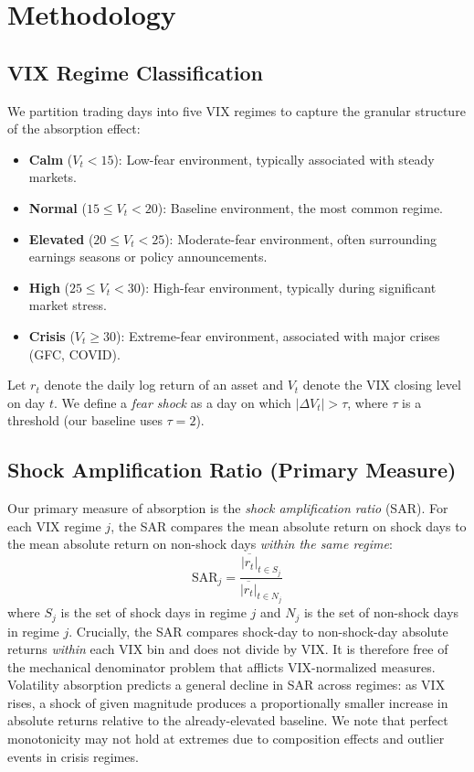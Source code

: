 \documentclass[12pt,a4paper]{article}
\begin{document}
\section{Methodology}
\label{sec:method}

\subsection{VIX Regime Classification}

We partition trading days into five VIX regimes to capture the granular structure of the absorption effect:
\begin{itemize}
    \item \textbf{Calm} ($V_t < 15$): Low-fear environment, typically associated with steady markets.
    \item \textbf{Normal} ($15 \leq V_t < 20$): Baseline environment, the most common regime.
    \item \textbf{Elevated} ($20 \leq V_t < 25$): Moderate-fear environment, often surrounding earnings seasons or policy announcements.
    \item \textbf{High} ($25 \leq V_t < 30$): High-fear environment, typically during significant market stress.
    \item \textbf{Crisis} ($V_t \geq 30$): Extreme-fear environment, associated with major crises (GFC, COVID).
\end{itemize}

Let $r_t$ denote the daily log return of an asset and $V_t$ denote the VIX closing level on day $t$. We define a \textit{fear shock} as a day on which $|\Delta V_t| > \tau$, where $\tau$ is a threshold (our baseline uses $\tau = 2$).

\subsection{Shock Amplification Ratio (Primary Measure)}

Our primary measure of absorption is the \textit{shock amplification ratio} (SAR). For each VIX regime $j$, the SAR compares the mean absolute return on shock days to the mean absolute return on non-shock days \textit{within the same regime}:
\begin{equation}
\text{SAR}_j = \frac{\overline{|r_t|}_{t \in S_j}}{\overline{|r_t|}_{t \in N_j}}
\label{eq:sar}
\end{equation}
where $S_j$ is the set of shock days in regime $j$ and $N_j$ is the set of non-shock days in regime $j$. Crucially, the SAR compares shock-day to non-shock-day absolute returns \textit{within} each VIX bin and does not divide by VIX. It is therefore free of the mechanical denominator problem that afflicts VIX-normalized measures. Volatility absorption predicts a general decline in SAR across regimes: as VIX rises, a shock of given magnitude produces a proportionally smaller increase in absolute returns relative to the already-elevated baseline. We note that perfect monotonicity may not hold at extremes due to composition effects and outlier events in crisis regimes.
\end{document}
